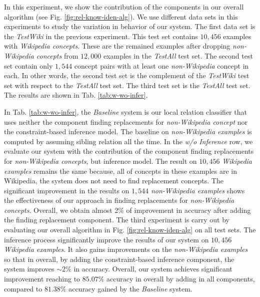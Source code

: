 In this experiment, we show the contribution of the components in our
overall algorithm (see Fig. \ref{fig:rel-know-iden-alg}). We use
different data sets in this experiments to study the variation in
behavior of our system. The first data set is the {\em TestWiki} in
the previous experiment. This test set contains $10,456$ examples with
{\em Wikipedia concepts}. These are the remained examples after
dropping {\em non-Wikipedia concepts} from $12,000$ examples in the
{\em TestAll} test set. The second test set contain only $1,544$
concept pairs with at least one {\em non-Wikipedia} concept in
each. In other words, the second test set is the complement of the
{\em TestWiki} test set with respect to the {\em TestAll} test
set. The third test set is the {\em TestAll} test set. The results are
shown in Tab. \ref{tab:w-wo-infer}.

In Tab. \ref{tab:w-wo-infer}, the {\em Baseline} system is our local
relation classifier that uses neither the component finding
replacements for {\em non-Wikipedia concept} nor the constraint-based
inference model. The baseline on {\em non-Wikipedia examples} is
computed by assuming sibling relation all the time. In the {\em w/o
  Inference} row, we evaluate our system with the contribution of the
component finding replacements for {\em non-Wikipedia concepts}, but
inference model. The result on $10,456$ {\em Wikipedia examples}
remains the same because, all of concepts in these examples are in
Wikipedia, the system does not need to find replacement concepts. The
significant improvement in the results on $1,544$ {\em non-Wikipedia
  examples} shows the effectiveness of our approach in finding
replacements for {\em non-Wikipedia concepts}. Overall, we obtain
almost $2\%$ of improvement in accuracy after adding the finding
replacement component. The third experiment is carry out by evaluating
our overall algorithm in Fig. \ref{fig:rel-know-iden-alg} on all test
sets. The inference process significantly improve the results of our
system on $10,456$ {\em Wikipedia examples}. It also gains
improvements on the {\em non-Wikipedia examples} so that in overall,
by adding the constraint-based inference component, the system improves
$\sim 2\%$ in accuracy. Overall, our system achieves
significant improvement reaching to $85.07\%$ accuracy in overall by
adding in all components, compared to $81.38\%$ accuracy gained by the
{\em Baseline} system.



